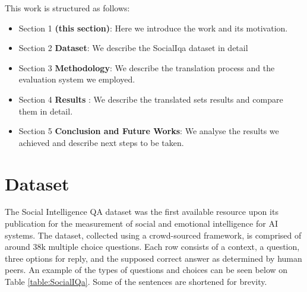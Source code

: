 \documentclass{article}
\begin{document}
This work is structured as follows:
\begin{itemize}
    \item Section 1 \textbf{(this section)}: Here we introduce the work and its
    motivation.
    \item Section 2 \textbf{Dataset}: We describe the SocialIqa dataset in
    detail
    \item Section 3 \textbf{Methodology}: We describe the translation process
    and the evaluation system we employed.
    \item Section 4 \textbf{Results} : We describe the translated sets results
    and compare them in detail.
    \item Section 5 \textbf{Conclusion and Future Works}: We analyse the results
    we achieved and describe next steps to be taken.
\end{itemize}

\section{Dataset}
The Social Intelligence QA dataset was the first available resource upon its
publication for the measurement of social and emotional intelligence for AI
systems. The dataset, collected using a crowd-sourced framework,  is comprised
of around 38k multiple choice questions. Each row consists of a context, a
question, three options for reply, and the supposed correct answer as determined
by human peers. An example of the types of questions and choices can be seen below on Table
\ref{table:SocialIQa}. Some of the sentences are shortened for brevity.

\begin{table}[!ht]
    \caption{Example rows from the SocialIQa English dataset.}\label{table:SocialIQa}
\end{table}
\end{document}

